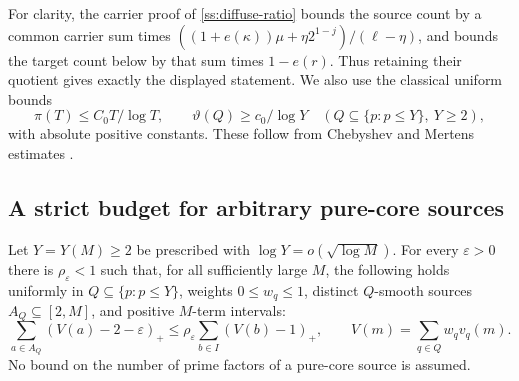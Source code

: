 For clarity, the carrier proof of \eqref{ss:diffuse-ratio} bounds the
source count by a common carrier sum times
$((1+e(\kappa))\mu+\eta2^{1-j})/(\ell-\eta)$, and bounds the target
count below by that sum times $1-e(r)$. Thus retaining their quotient
gives exactly the displayed statement.
We also use the classical uniform bounds
\begin{equation}
 \pi(T)\le C_0T/\log T,\qquad
 \vartheta(Q)\ge c_0/\log Y
 \quad(Q\subseteq\{p:p\le Y\},\ Y\ge2),
 \label{ss:prime-inputs}
\end{equation}
with absolute positive constants. These follow from Chebyshev and
Mertens estimates \cite{GranvilleSound,TaoMertens}.

\subsection{A strict budget for arbitrary pure-core sources}

\begin{proposition}
\label{ss:pure-core}
Let $Y=Y(M)\ge2$ be prescribed with $\log Y=o(\sqrt{\log M})$.
For every $\varepsilon>0$ there is $\rho_\varepsilon<1$ such that,
for all sufficiently large $M$, the following holds uniformly in
$Q\subseteq\{p:p\le Y\}$, weights $0\le w_q\le1$, distinct
$Q$-smooth sources $A_Q\subseteq[2,M]$, and positive $M$-term intervals:
\begin{equation}
 \sum_{a\in A_Q}(V(a)-2-\varepsilon)_+
 \le \rho_\varepsilon
       \sum_{b\in I}(V(b)-1)_+,
 \qquad V(m)=\sum_{q\in Q}w_qv_q(m).
 \label{ss:pure-contraction}
\end{equation}
No bound on the number of prime factors of a pure-core source is assumed.
\end{proposition}

